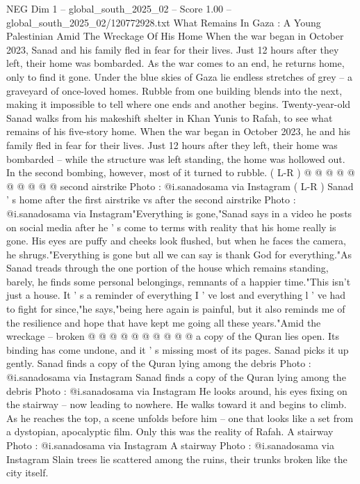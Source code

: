 \begin{textsample}{NEG Dim 1 – global\_south\_2025\_02 – Score 1.00 – global\_south\_2025\_02/120772928.txt}  \label{ex:f1_neg_090}
What Remains In Gaza : A Young Palestinian Amid The Wreckage Of His Home When the war began in October 2023, Sanad and his family fled in fear for their lives.
Just 12 hours after they left, their home was bombarded.
As the war comes to an end, he returns home, only to find it gone.
Under the blue skies of Gaza lie endless stretches of grey -- a graveyard of once-loved homes.
Rubble from one building blends into the next, making it impossible to tell where one ends and another begins.
Twenty-year-old Sanad walks from his makeshift shelter in Khan Yunis to Rafah, to see what remains of his five-story home.
When the war began in October 2023, he and his family fled in fear for their lives.
Just 12 hours after they left, their home was bombarded -- while the structure was left standing, the home was hollowed out.
In the second bombing, however, most of it turned to rubble. ( L-R ) @ @ @ @ @ @ @ @ @ @ second airstrike Photo : @i.sanadosama via Instagram ( L-R ) Sanad ' s home after the first airstrike vs after the second airstrike Photo : @i.sanadosama via Instagram"Everything is gone,"Sanad says in a video he posts on social media after he ' s come to terms with reality that his home really is gone.
His eyes are puffy and cheeks look flushed, but when he faces the camera, he shrugs."Everything is gone but all we can say is thank God for everything."As Sanad treads through the one portion of the house which remains standing, barely, he finds some personal belongings, remnants of a happier time."This isn't just a house.
It ' s a reminder of everything I ' ve lost and everything l ' ve had to fight for since,"he says,"being here again is painful, but it also reminds me of the resilience and hope that have kept me going all these years."Amid the wreckage -- broken @ @ @ @ @ @ @ @ @ @ a copy of the Quran lies open.
Its binding has come undone, and it ' s missing most of its pages.
Sanad picks it up gently.
Sanad finds a copy of the Quran lying among the debris Photo : @i.sanadosama via Instagram Sanad finds a copy of the Quran lying among the debris Photo : @i.sanadosama via Instagram He looks around, his eyes fixing on the stairway -- now leading to nowhere.
He walks toward it and begins to climb.
As he reaches the top, a scene unfolds before him -- one that looks like a set from a dystopian, apocalyptic film.
Only this was the reality of Rafah.
A stairway Photo : @i.sanadosama via Instagram A stairway Photo : @i.sanadosama via Instagram Slain trees lie scattered among the ruins, their trunks broken like the city itself.

\end{textsample}
